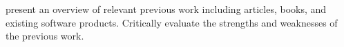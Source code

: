present an overview of relevant previous work including articles, books, and existing software products. Critically evaluate the strengths and weaknesses of the previous work.